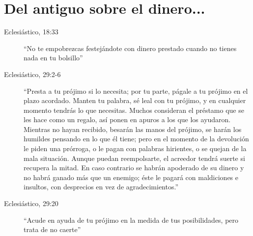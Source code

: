 \documentclass[12pt]{book} %
\begin{document}
\chapter{Del antiguo sobre el dinero...}
\begin{description}
\item[Eclesiástico, 18:33] ``No te empobrezcas festejándote con dinero prestado cuando no tienes nada en tu bolsillo''
\item[Eclesiástico, 29:2-6] ``Presta a tu prójimo si lo necesita; por tu parte, págale a tu prójimo en el plazo acordado.
Manten tu palabra, sé leal con tu prójimo, y en cualquier momento tendrás lo que necesitas.
Muchos consideran el préstamo que se les hace como un regalo, así ponen en apuros a los que los ayudaron.
Mientras no hayan recibido, besarán las manos del prójimo, se harán los humildes pensando en lo que él tiene; pero en el momento de la devolución le piden una prórroga, o le pagan con palabras hirientes, o se quejan de la mala situación.
Aunque puedan reempolsarte, el acreedor tendrá  suerte si recupera la mitad. En caso contrario se habrán  apoderado de su dinero y no habrá ganado más que un enemigo; éste le pagará con maldiciones e insultos, con desprecios en vez de agradecimientos.''
\item[Eclesiástico, 29:20]``Acude en ayuda de tu prójimo en la medida de tus posibilidades, pero trata de no caerte''
\end{description}
\end{document}

